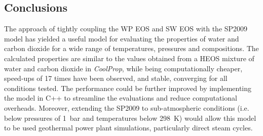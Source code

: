 \subsection{Conclusions}
\label{sec:tppm_semi_conclusions}
    The approach of tightly coupling the \ac{WP} \ac{EOS} and \ac{SW} \ac{EOS} with the \ac{SP2009} model has yielded a useful model for evaluating the properties of water and carbon dioxide for a wide range of temperatures, pressures and compositions. The calculated properties are similar to the values obtained from a \ac{HEOS} mixture of water and carbon dioxide in \emph{CoolProp}, while being computationally cheaper, speed-ups of \num{17} times have been observed, and stable, converging for all conditions tested. The performance could be further improved by implementing the model in C++ to streamline the evaluations and reduce computational overheads. Moreover, extending the \ac{SP2009} to sub-atmospheric conditions (i.e. below pressures of \qty{1}{bar} and temperatures below \qty{298}{\K}) would allow this model to be used geothermal power plant simulations, particularly direct steam cycles. 